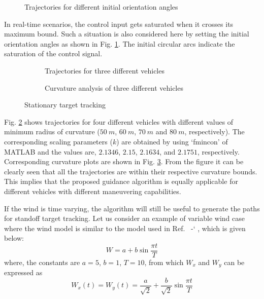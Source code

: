 \documentclass[Afour,sagev,times]{sagej}
\newcommand*{\citen}[1]{%
  \begingroup
    \romannumeral-`\x %
    \setcitestyle{numbers}%
    \cite{#1}%
  \endgroup   
}
\begin{document}
\begin{figure}[htpb]
	\centering
	\caption{Trajectories for different initial orientation angles}
	\label{fig:diff}
\end{figure}
In real-time scenarios, the control input gets saturated when it crosses its maximum bound. Such a situation is also considered here by setting the initial orientation angles as shown in Fig. \ref{fig:diff}. The initial circular arcs indicate the saturation of the control signal. 


\begin{figure}[htpb]
	\begin{subfigure}{0.5\textwidth}
	\centering
	\caption{Trajectories for three different vehicles}
	\label{fig:rmin}
	
	\end{subfigure}
\begin{subfigure}{0.5\textwidth}
	\centering
	\caption{Curvature analysis of three different vehicles}
	\label{fig:kappa for different}
\end{subfigure}
\caption{Stationary target tracking}
\label{fig:fig_three}
\end{figure}


Fig. \ref{fig:rmin} shows trajectories for four different vehicles with different values of minimum radius of curvature ($50~m$, $60~m$, $70~m$ and $80~m$, respectively). The corresponding scaling parameters ($k$) are obtained by using `fmincon' of MATLAB  and the values are, $2.1346$, $2.15$, $2.1634$, and $2.1751$, respectively. Corresponding curvature plots are shown in Fig. \ref{fig:kappa for different}. From the figure it can be clearly seen that all the trajectories are within their respective curvature bounds. This implies that the proposed guidance algorithm is equally applicable for different vehicles with different maneuvering capabilities.

If the wind is time varying, the algorithm will still be useful to generate the paths for standoff target tracking. Let us consider an example of variable wind case where the wind model is similar to the model used in Ref.~\citen{hota2014time}, which is given below:
\begin{equation}\label{raterelnpp-}
W=a+b\sin \frac{\pi t}{T}
\end{equation}
where, the constants are $a=5$, $b=1$, $T=10$, from which $W_x$ and $W_y$ can be expressed as
\begin{equation}\label{raterelnpp}
W_x(t)=W_y(t)=\frac{a}{\sqrt{2}}+\frac{b}{\sqrt{2}}\sin \frac{\pi t}{T}
\end{equation}  
\end{document}
